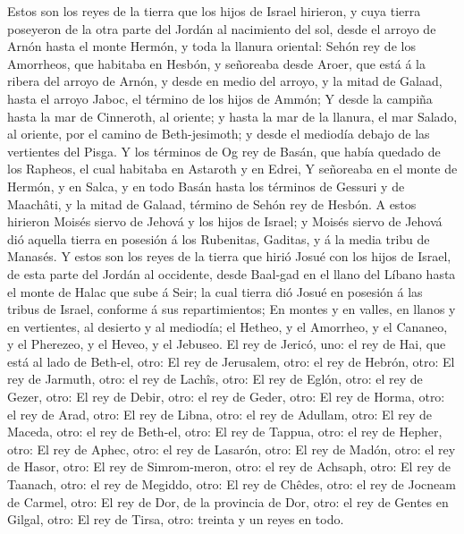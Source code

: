  Estos son los reyes de la tierra que los hijos de Israel
hirieron, y cuya tierra poseyeron de la otra parte del Jordán al
nacimiento del sol, desde el arroyo de Arnón hasta el monte Hermón, y
toda la llanura oriental:  Sehón rey de los Amorrheos, que
habitaba en Hesbón, y señoreaba desde Aroer, que está á la ribera del
arroyo de Arnón, y desde en medio del arroyo, y la mitad de Galaad,
hasta el arroyo Jaboc, el término de los hijos de Ammón;  Y
desde la campiña hasta la mar de Cinneroth, al oriente; y hasta la mar
de la llanura, el mar Salado, al oriente, por el camino de
Beth-jesimoth; y desde el mediodía debajo de las vertientes del Pisga.
 Y los términos de Og rey de Basán, que había quedado de los
Rapheos, el cual habitaba en Astaroth y en Edrei,  Y
señoreaba en el monte de Hermón, y en Salca, y en todo Basán hasta los
términos de Gessuri y de Maachâti, y la mitad de Galaad, término de
Sehón rey de Hesbón.  A estos hirieron Moisés siervo de
Jehová y los hijos de Israel; y Moisés siervo de Jehová dió aquella
tierra en posesión á los Rubenitas, Gaditas, y á la media tribu de
Manasés.  Y estos son los reyes de la tierra que hirió Josué
con los hijos de Israel, de esta parte del Jordán al occidente, desde
Baal-gad en el llano del Líbano hasta el monte de Halac que sube á Seir;
la cual tierra dió Josué en posesión á las tribus de Israel, conforme á
sus repartimientos;  En montes y en valles, en llanos y en
vertientes, al desierto y al mediodía; el Hetheo, y el Amorrheo, y el
Cananeo, y el Pherezeo, y el Heveo, y el Jebuseo.  El rey de
Jericó, uno: el rey de Hai, que está al lado de Beth-el, otro:
 El rey de Jerusalem, otro: el rey de Hebrón, otro:
 El rey de Jarmuth, otro: el rey de Lachîs, otro:
 El rey de Eglón, otro: el rey de Gezer, otro:
 El rey de Debir, otro: el rey de Geder, otro:
 El rey de Horma, otro: el rey de Arad, otro: 
El rey de Libna, otro: el rey de Adullam, otro:  El rey de
Maceda, otro: el rey de Beth-el, otro:  El rey de Tappua,
otro: el rey de Hepher, otro:  El rey de Aphec, otro: el
rey de Lasarón, otro:  El rey de Madón, otro: el rey de
Hasor, otro:  El rey de Simrom-meron, otro: el rey de
Achsaph, otro:  El rey de Taanach, otro: el rey de Megiddo,
otro:  El rey de Chêdes, otro: el rey de Jocneam de Carmel,
otro:  El rey de Dor, de la provincia de Dor, otro: el rey
de Gentes en Gilgal, otro:  El rey de Tirsa, otro: treinta
y un reyes en todo.

